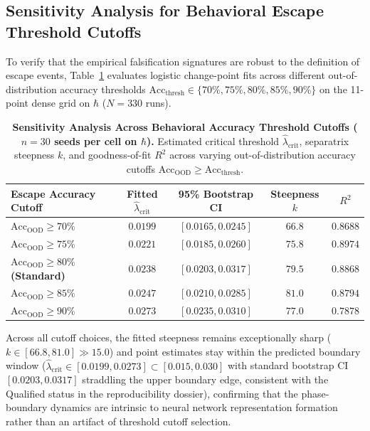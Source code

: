 \documentclass{article}
\theoremstyle{plain}
\theoremstyle{definition}
\begin{document}
\subsection{Sensitivity Analysis for Behavioral Escape Threshold Cutoffs}
\label{sec:app_threshold_sensitivity}
To verify that the empirical falsification signatures are robust to the definition of escape events, Table~\ref{tab:threshold_sensitivity} evaluates logistic change-point fits across different out-of-distribution accuracy thresholds $\text{Acc}_{\text{thresh}} \in \{70\%, 75\%, 80\%, 85\%, 90\%\}$ on the 11-point dense grid on $\hbar$ ($N=330$ runs).

\begin{table}[h]
\centering
\caption{\textbf{Sensitivity Analysis Across Behavioral Accuracy Threshold Cutoffs ($n=30$ seeds per cell on $\hbar$).} Estimated critical threshold $\hat{\lambda}_{\text{crit}}$, separatrix steepness $k$, and goodness-of-fit $R^2$ across varying out-of-distribution accuracy cutoffs $\text{Acc}_{\text{OOD}} \ge \text{Acc}_{\text{thresh}}$.}
\label{tab:threshold_sensitivity}
\vskip 0.1in
\begin{small}
\begin{sc}
\begin{tabular}{lcccc}
\toprule
Escape Accuracy Cutoff & Fitted $\hat{\lambda}_{\text{crit}}$ & 95\% Bootstrap CI & Steepness $k$ & $R^2$ \\
\midrule
$\text{Acc}_{\text{OOD}} \ge 70\%$ & $0.0199$ & $[0.0165, 0.0245]$ & $66.8$ & $0.8688$ \\
$\text{Acc}_{\text{OOD}} \ge 75\%$ & $0.0221$ & $[0.0185, 0.0260]$ & $75.8$ & $0.8974$ \\
\textbf{$\text{Acc}_{\text{OOD}} \ge 80\%$ (Standard)} & $\mathbf{0.0238}$ & $\mathbf{[0.0203, 0.0317]}$ & $\mathbf{79.5}$ & $\mathbf{0.8868}$ \\
$\text{Acc}_{\text{OOD}} \ge 85\%$ & $0.0247$ & $[0.0210, 0.0285]$ & $81.0$ & $0.8794$ \\
$\text{Acc}_{\text{OOD}} \ge 90\%$ & $0.0273$ & $[0.0235, 0.0310]$ & $77.0$ & $0.7878$ \\
\bottomrule
\end{tabular}
\end{sc}
\end{small}
\end{table}
Across all cutoff choices, the fitted steepness remains exceptionally sharp ($k \in [66.8, 81.0] \gg 15.0$) and point estimates stay within the predicted boundary window ($\hat{\lambda}_{\text{crit}} \in [0.0199, 0.0273] \subset [0.015, 0.030]$ with standard bootstrap CI $[0.0203, 0.0317]$ straddling the upper boundary edge, consistent with the Qualified status in the reproducibility dossier), confirming that the phase-boundary dynamics are intrinsic to neural network representation formation rather than an artifact of threshold cutoff selection.
\end{document}
